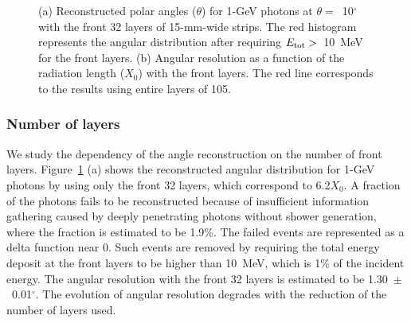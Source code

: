 \documentclass[12pt,times,draftclsnofoot,a4paper]{elsarticle}
\begin{document}
\begin{figure}[!hbt]
\centering
{}
\caption{ (a) Reconstructed polar angles ($\theta$) for 1-GeV photons at $\theta=$~10$^{\circ}$  with the front 32 layers of 15-mm-wide strips. The red histogram represents the angular distribution after requiring $E_{\rm{tot}}>$~10~MeV for the front layers. (b) Angular resolution as a function of the radiation length ($X_{0}$) with the front layers. The red line corresponds to the results using entire layers of 105.}
\label{fig:angle_reco_layer}
\end{figure}

\subsubsection{Number of layers}
We study the dependency of the angle reconstruction on the number of front layers. Figure~\ref{fig:angle_reco_layer} (a) shows the reconstructed angular distribution for 1-GeV photons by using only the front 32 layers, which correspond to 6.2$X_{0}$. A fraction of the photons fails to be reconstructed because of insufficient information gathering caused by deeply penetrating photons without shower generation, where the fraction is estimated to be 1.9\%. The failed events are represented as a delta function near 0. Such events are removed by requiring the total energy deposit at the front layers to be higher than 10~MeV, which is 1\% of the incident energy. The angular resolution with the front 32 layers is estimated to be 1.30~$\pm$~0.01$^{\circ}$. The evolution of angular resolution degrades with the reduction of the number of layers used.
\end{document}
